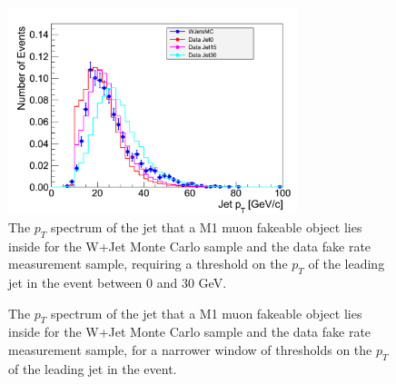 \begin{figure}[!htbp]
\begin{center}
\includegraphics[width=0.75\textwidth]{figures/LeptonJetPt_MuonM1_0To30.pdf}
\caption{The $p_{T}$ spectrum of the jet that a M1 muon fakeable object lies inside for the 
W+Jet Monte Carlo sample and the data fake rate measurement sample, requiring a threshold on the $p_{T}$ of 
the leading jet in the event between $0$ and $30$ GeV.}
\label{fig:mu_M1_fr_jetspectrum0To30}
\end{center}
\end{figure}

\begin{figure}[!htbp]
\begin{center}
\caption{The $p_{T}$ spectrum of the jet that a M1 muon fakeable object lies inside for the 
W+Jet Monte Carlo sample and the data fake rate measurement sample, for a narrower window of thresholds
on the $p_{T}$ of the leading jet in the event.}
\label{fig:mu_M1_fr_jetspectrumNarrowerWindow}
\end{center}
\end{figure}

